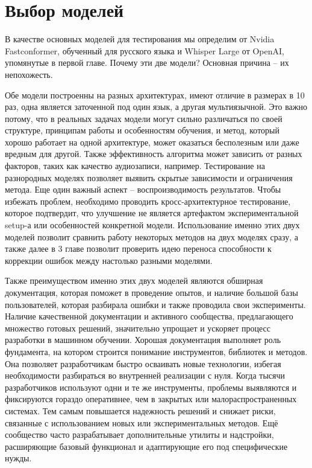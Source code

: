 \section{Выбор моделей}
В качестве основных моделей для тестирования мы определим от Nvidia Fastconformer, обученный для русского языка и Whisper Large от OpenAI, упомянутые в первой главе.
Почему эти две модели? Основная причина -- их непохожесть.

Обе модели построенны на разных архитектурах, имеют отличие в размерах в 10 раз, одна является заточенной под один язык, а другая мультиязычной.
Это важно потому, что в реальных задачах модели могут сильно различаться по своей структуре, принципам работы и особенностям обучения, и метод, который хорошо работает на одной архитектуре, может оказаться бесполезным или даже вредным для другой.
Также эффективность алгоритма может  зависить от разных факторов, таких как качество аудиозаписи, например.
Тестирование на разнородных моделях позволяет выявить скрытые зависимости и ограничения метода.
Еще один важный аспект -- воспроизводимость результатов.
Чтобы избежать проблем, необходимо проводить кросс-архитектурное тестирование, которое подтвердит, что улучшение не является артефактом экспериментальной setup-а или особенностей конкретной модели.
Использование именно этих двух моделей позволит сравнить работу некоторых методов на двух моделях сразу, а также далее в 3 главе позволит проверить идею переноса способности к коррекции ошибок между настолько разными моделями.

Также преимуществом именно этих двух моделей являются обширная документация, которая поможет в проведение опытов, и наличие большой базы пользователей, которая разбирала ошибки и также проводила свои эксперименты.
Наличие качественной документации и активного сообщества, предлагающего множество готовых решений, значительно упрощает и ускоряет процесс разработки в машинном обучении. Хорошая документация выполняет роль фундамента, на котором строится понимание инструментов, библиотек и методов. Она позволяет разработчикам быстро осваивать новые технологии, избегая необходимости разбираться во внутренней реализации с нуля.
Когда тысячи разработчиков используют одни и те же инструменты, проблемы выявляются и фиксируются гораздо оперативнее, чем в закрытых или малораспространенных системах.
Тем самым повышается надежность решений и снижает риски, связанные с использованием новых или экспериментальных методов.
Ещё сообщество часто разрабатывает дополнительные утилиты и надстройки, расширяющие базовый функционал и адаптирующие его под специфические нужды.

